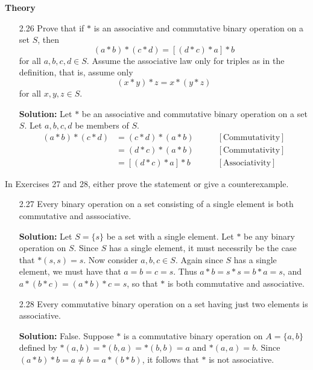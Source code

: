 \noindent \textbf{Theory}

\begin{enumerate}
   \item[2.26] Prove that if $*$ is an associative and commutative binary
               operation on a set $S$, then
               $$(a * b) * (c * d) = [(d * c) * a] * b$$
               for all $a, b, c, d \in S$. Assume the associative law only for
               triples as in the definition, that is, assume only
               $$(x * y) * z =  x * (y * z)$$
               for all $x, y, z \in S$.

      \textbf{Solution:} Let $*$ be an associative and commutative binary
               operation on a set $S$. Let $a, b, c, d$ be members of $S$.
      \begin{align*}
         (a * b) * (c * d) &= (c * d) * (a * b) &\qquad[\text{Commutativity}] \\
            &= (d * c) * (a * b) &\qquad [\text{Commutativity}] \\
            &= [(d * c) * a] * b &\qquad [\text{Associativity}]
      \end{align*}
\end{enumerate}

\noindent In Exercises 27 and 28, either prove the statement or give a 
          counterexample.

\begin{enumerate}
   \item[2.27] Every binary operation on a set consisting of a single element is
               both commutative and asssociative.

      \textbf{Solution:} Let $S = \{s\}$ be a set with a single element. Let 
      $*$ be any binary operation on $S$. Since $S$ has a single element, it 
      must necessrily be the case that $*(s, s) = s$. Now consider
      $a, b, c \in S$. Again since $S$ has a single element, we must have that
      $a = b = c = s$. Thus $a * b = s * s = b * a = s$, and $a * (b * c) =
      (a * b) * c = s$, so that $*$ is both commutative and associative.
   \item[2.28] Every commutative binary operation on a set having just two
               elements is associative.

      \textbf{Solution:} False. Suppose $*$ is a commutative binary operation
      on $A = \{a, b\}$ defined by $*(a, b) = *(b, a) = *(b, b) = a$ and
      $*(a, a) = b$. Since $(a * b) * b = a \neq b = a * (b * b)$, it follows
      that $*$ is not associative.
\end{enumerate}


